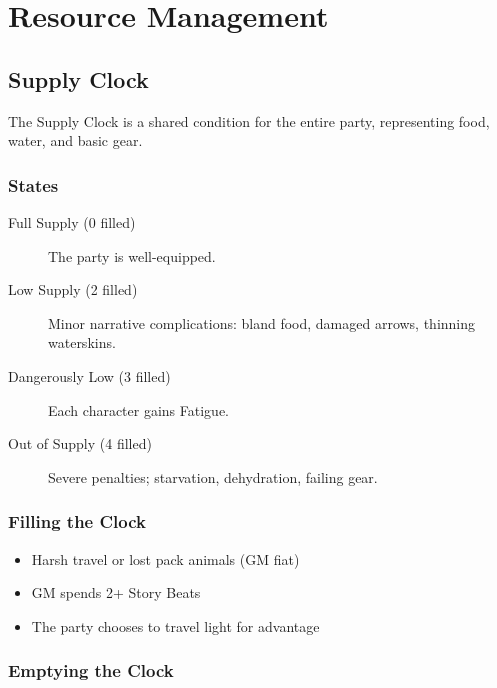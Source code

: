 \chapter{Resource Management}

\section{Supply Clock}

The Supply Clock is a shared condition for the entire party, representing food, water, and basic gear.

\subsection{States}

\begin{description}
\item[Full Supply (0 filled)] The party is well-equipped.
\item[Low Supply (2 filled)] Minor narrative complications: bland food, damaged arrows, thinning waterskins.
\item[Dangerously Low (3 filled)] Each character gains Fatigue.
\item[Out of Supply (4 filled)] Severe penalties; starvation, dehydration, failing gear.
\end{description}

\subsection{Filling the Clock}

\begin{itemize}
\item Harsh travel or lost pack animals (GM fiat)
\item GM spends 2+ Story Beats
\item The party chooses to travel light for advantage
\end{itemize}

\subsection{Emptying the Clock}

